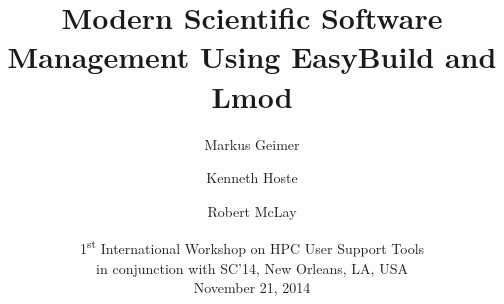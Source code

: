 \documentclass[10pt,xcolor={usenames,dvipsnames}]{beamer}
\begin{document}

\title{Modern Scientific Software Management Using EasyBuild and Lmod}
\author{%
    Markus Geimer%
    \and%
    Kenneth Hoste%
    \and
    Robert McLay%
}
\date{%
    \small%
    1\textsuperscript{st} International Workshop on HPC User Support Tools\\%
    in conjunction with SC'14, New Orleans, LA, USA\\%
    November 21, 2014%
}

\frame{\titlepage}

\end{document}
